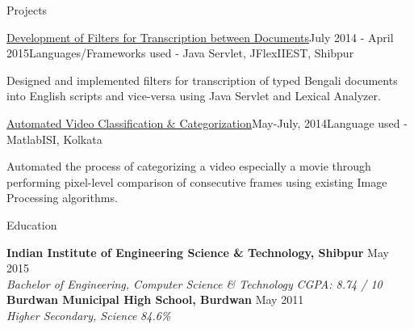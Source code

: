 \documentclass{resume}
\begin{document}

\begin{rSection}{Projects}

\begin{rSubsection}{\href{https://github.com/surajeet01/online-transcription}{Development of Filters for Transcription between Documents}}{}{July 2014 - April 2015}{Languages/Frameworks used - Java Servlet, JFlex}{IIEST, Shibpur}
\item Designed and implemented filters for transcription of typed Bengali documents into English scripts and vice-versa using Java Servlet and Lexical Analyzer.
\end{rSubsection}

\begin{rSubsection}{\href{https://github.com/surajeet01/movie-categorizarion}{Automated Video Classification \& Categorization}}{}{May-July, 2014}{Language used - Matlab}{ISI, Kolkata}{}
\item Automated the process of categorizing a video especially a movie through performing pixel-level comparison of consecutive frames using existing Image Processing algorithms.
\end{rSubsection}

\end{rSection}



\begin{rSection}{Education}

{\bf Indian Institute of Engineering Science \& Technology, Shibpur} \hfill May 2015 \\ 
{\em Bachelor of Engineering, Computer Science \& Technology} \hfill {\em CGPA: 8.74 / 10} \smallskip \smallskip \\
{\bf Burdwan Municipal High School, Burdwan} \hfill May 2011 \\ 
{\em Higher Secondary, Science} \hfill {\em 84.6\%} \\  

\end{rSection}

\end{document}

